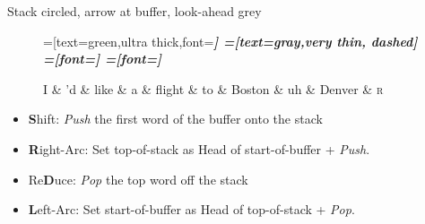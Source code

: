 \documentclass{lecture}
\begin{document}
\begin{plain}{Stack circled, arrow at buffer, look-ahead grey}
\begin{figure}
    \centering
    \begin{dependency}[theme=simple]
    =[text=green,ultra thick,font=\bfseries\itshape]
    =[text=gray,very thin, dashed]
    =[font=\bfseries\itshape]
    =[font=\itshape]
    \begin{deptext}[column sep=.075cm, row sep=.1ex]
        I \& 'd \& like \& a \& flight \& to \& Boston \& uh \& Denver \&  \textsc{r} \\
    \end{deptext}
\end{dependency}

\end{figure}
    \begin{itemize}
        \item \textbf{S}hift: \emph{Push} the first word of the buffer onto the stack
    \item \textbf{R}ight-Arc: Set top-of-stack as Head of start-of-buffer + \emph{Push}.
    \item Re\textbf{D}uce: \emph{Pop} the top word off the stack
    \item \textbf{L}eft-Arc: Set start-of-buffer as Head of top-of-stack + \emph{Pop}.
    \end{itemize}
\end{plain}
\end{document}
